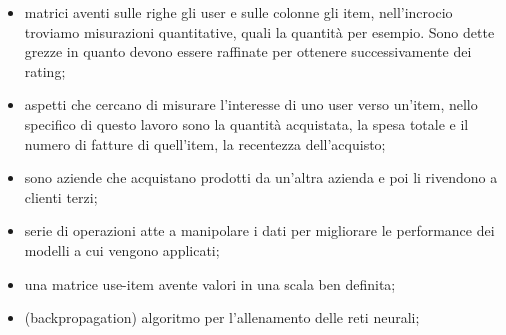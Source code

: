 
\begin{itemize} 
	\item {} matrici aventi sulle righe gli user e sulle colonne gli item, nell'incrocio troviamo misurazioni quantitative, quali la quantità per esempio. Sono dette grezze in quanto devono essere raffinate per ottenere successivamente dei rating;
	\item {} aspetti che cercano di misurare l'interesse di uno user verso un'item, nello specifico di questo lavoro sono la quantità acquistata, la spesa totale e il numero di fatture di quell'item, la recentezza dell'acquisto;
	\item {} sono aziende che acquistano prodotti da un'altra azienda e poi li rivendono a clienti terzi;
	\item {} serie di operazioni atte a manipolare i dati per migliorare le performance dei modelli a cui vengono applicati;
	\item {} una matrice use-item avente valori in una scala ben definita;
	\item \gloTarget(backpropagation) algoritmo per l'allenamento delle reti neurali;
\end{itemize}